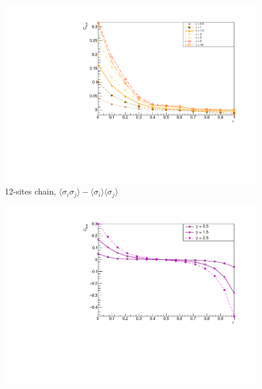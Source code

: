 \begin{figure}[H]
    \centering
    \includegraphics[scale=0.7]{Figures/12sites/12sites_CFBulkCONNVSgamma.pdf}
    \caption{12-sites chain, $\langle\sigma_i\sigma_j \rangle - \langle\sigma_i \rangle\langle\sigma_j \rangle$}
    \label{fig:my_label}
\end{figure}

\begin{figure}[H]
    \centering
    \includegraphics[scale=0.7]{Figures/16sites/16sites_CFBulkVSgamma.pdf}
    \caption{}
    \label{fig:my_label}
\end{figure}

